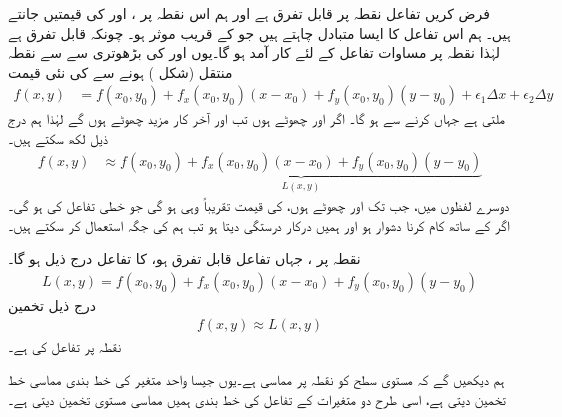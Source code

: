 فرض کریں   تفاعل  نقطہ  پر  قابل تفرق ہے  اور ہم اس نقطہ پر     ،  اور  کی  قیمتیں  جانتے ہیں۔ ہم  اس تفاعل کا ایسا متبادل  چاہتے ہیں جو      کے قریب  موثر ہو۔ چونکہ  قابل تفرق ہے لہٰذا نقطہ  پر مساوات   تفاعل  کے لئے کار آمد ہو گا۔یوں  اور  کی بڑھوتری  سے    سے نقطہ    منتقل  (شکل )    ہونے سے  کی نئی قیمت
\begin{align*}
f(x,y)&=f(x_0,y_0)+f_x(x_0,y_0)(x-x_0)+f_y(x_0,y_0)(y-y_0)+\epsilon_1\Delta x+\epsilon_2\Delta y
\end{align*}
ملتی ہے جہاں  کرنے سے  ہو گا۔ اگر  اور  چھوٹے ہوں تب  اور  آخر کار مزید چھوٹے ہوں گے لہٰذا ہم درج ذیل لکھ سکتے ہیں۔
\begin{align*}
f(x,y)&\approx \underbrace{f(x_0,y_0)+f_x(x_0,y_0)(x-x_0)+f_y(x_0,y_0)(y-y_0)}_{L(x,y)}
\end{align*}
دوسرے لفظوں میں، جب تک  اور  چھوٹے ہوں،  کی قیمت تقریباً وہی ہو گی جو خطی تفاعل  کی ہو گی۔ اگر  کے ساتھ کام کرنا دشوار ہو اور  ہمیں درکار درستگی دیتا ہو تب ہم  کی جگہ  استعمال کر سکتے ہیں۔

نقطہ پر  ،  جہاں تفاعل  قابل تفرق ہو،  کا تفاعل درج ذیل ہو گا۔
\begin{align}\label{مساوات_کثیرالمتغیر_خط_بند_تخمین}
L(x,y)=f(x_0,y_0)+f_x(x_0,y_0)(x-x_0)+f_y(x_0,y_0)(y-y_0)
\end{align}
درج ذیل  تخمین
\begin{align*}
f(x,y)\approx L(x,y)
\end{align*}
  نقطہ  پر تفاعل   کی  ہے۔ 

ہم دیکھیں گے کہ مستوی  سطح  کو  نقطہ  پر مماسی ہے۔یوں  جیسا واحد متغیر کی خط بندی مماسی خط تخمین دیتی ہے، اسی طرح  دو متغیرات کے تفاعل کی خط بندی ہمیں مماسی مستوی  تخمین دیتی ہے۔

